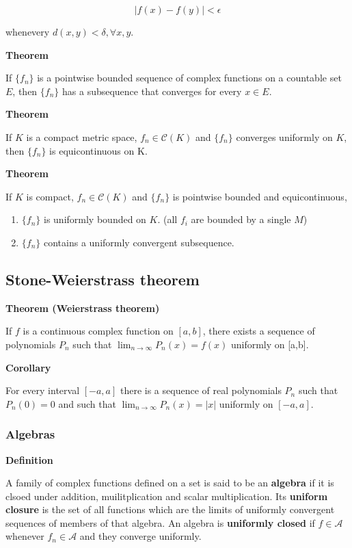 \documentclass[11pt]{article}
\begin{document}
\[
\vert f(x) - f(y) \vert < \epsilon
\]

whenevery \(d(x,y) < \delta, \forall x,y\).

\textbf{Theorem}

If \(\{f_n\}\) is a pointwise bounded sequence of complex functions on a countable set \(E\), then \(\{f_n\}\) has a subsequence that converges for every \(x \in E\).

\textbf{Theorem}

If \(K\) is a compact metric space, \(f_n \in \mathcal{C}(K)\) and \(\{f_n\}\) converges uniformly on \(K\), then \(\{f_n\}\) is equicontinuous on K.

\textbf{Theorem}

If \(K\) is compact, \(f_n \in \mathcal{C}(K)\) and \(\{f_n\}\) is pointwise bounded and equicontinuous,

\begin{enumerate}
\item \(\{f_n\}\) is uniformly bounded on \(K\). (all \(f_i\) are bounded by a single \(M\))
\item \(\{f_n\}\) contains a uniformly convergent subsequence.
\end{enumerate}


\subsection{Stone-Weierstrass theorem}
\label{sec:org02cffb7}

\textbf{Theorem (Weierstrass theorem)}

If \(f\) is a continuous complex function on \([a,b]\), there exists a sequence of polynomials \(P_n\) such that \(\lim_{n\to\infty} P_n(x) = f(x)\) uniformly on [a,b].

\textbf{Corollary}

For every interval \([-a,a]\) there is a sequence of real polynomials \(P_n\) such that \(P_n(0) = 0\) and such that \(\lim_{n\to\infty}P_n(x) = |x|\) uniformly on \([-a,a]\).

\subsubsection{Algebras}
\label{sec:org29dbdf2}

\textbf{Definition}

A family of complex functions defined on a set is said to be an \textbf{algebra} if it is clsoed under addition, muilitplication and scalar multiplication. Its \textbf{uniform closure} is the set of all functions which are the limits of uniformly convergent sequences of members of that algebra. An algebra is \textbf{uniformly closed} if \(f \in \mathcal{A}\) whenever \(f_n \in \mathcal{A}\) and they converge uniformly.
\end{document}
